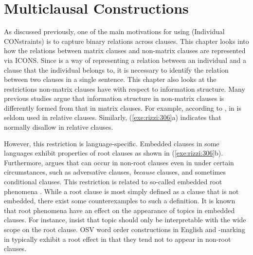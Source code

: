 \chapter{Multiclausal Constructions}
\label{chapter10-2}
\setcounter{enums}{0}

\noindent As discussed previously, one of the main motivations for
using  (Individual CONstraints)
is to capture binary relations across clauses.
This chapter looks into how the relations between matrix clauses and
non-matrix clauses are represented via ICONS. Since  is a
way of representing a relation between an individual and a clause that
the individual belongs to, it is necessary to identify the relation
between two clauses in a single sentence.  This chapter also looks at
the restrictions non-matrix clauses have with respect to information
structure.  Many previous studies argue that information structure in
non-matrix clauses is differently formed from that in matrix clauses.
For example, according to \citet{kuno:73}, \wa in  is
seldom used in relative clauses. Similarly,
(\ref{exe:rizzi:306}a) indicates that  normally disallow
 in relative clauses.


\noindent However, this restriction is language-specific.  Embedded
clauses in some languages exhibit properties of root clauses as shown
in (\ref{exe:rizzi:306}b).  Furthermore, \citet{haegeman:04} argues
that   can occur in non-root clauses even in
 under certain circumstances, such as adversative clauses,
\textit{because} clauses, and sometimes conditional clauses.  This
restriction is related to so-called embedded root phenomena
\citep{heycock:07}.
While a root clause is most simply defined as a
clause that is not embedded, there exist some counterexamples to such
a definition. It is known that root phenomena have an effect on the
appearance of topics in embedded clauses. For instance,
\citet{portner:yabushita:98} insist that topic should only be
interpretable with the wide scope on the root clause.  OSV word order
constructions in English and \wa-marking in  typically
exhibit a root effect in that they tend not to appear in non-root
clauses.


